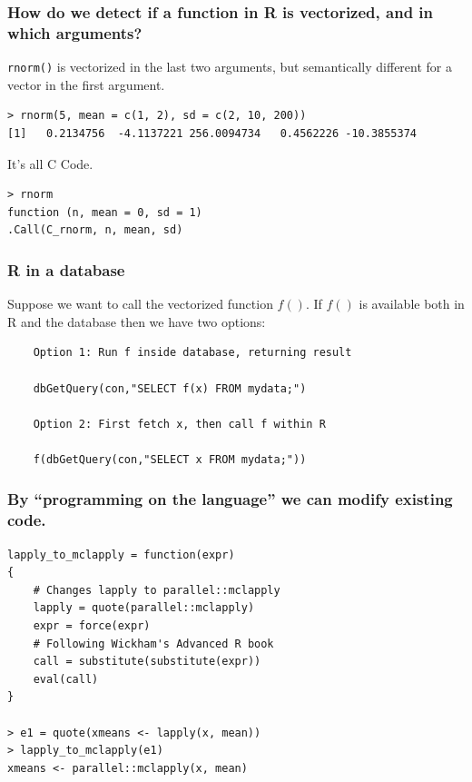 \documentclass{beamer}
\begin{document}
\begin{frame}[fragile]

    \frametitle{How do we detect if a function in R is vectorized, and in
    which arguments?}

    \texttt{rnorm()} is vectorized in the last two arguments, but
    semantically different for a vector in the first argument.

\begin{verbatim}
> rnorm(5, mean = c(1, 2), sd = c(2, 10, 200))
[1]   0.2134756  -4.1137221 256.0094734   0.4562226 -10.3855374
\end{verbatim}

It's all C Code.

\begin{verbatim}
> rnorm
function (n, mean = 0, sd = 1)
.Call(C_rnorm, n, mean, sd)
\end{verbatim}

\end{frame}
\begin{frame}[fragile]

    \frametitle{R in a database}

    Suppose we want to call the vectorized function $f()$. If $f()$ is
    available both in R and the database then we have two options:

\begin{verbatim}
    Option 1: Run f inside database, returning result
    
    dbGetQuery(con,"SELECT f(x) FROM mydata;")

    Option 2: First fetch x, then call f within R

    f(dbGetQuery(con,"SELECT x FROM mydata;"))
\end{verbatim}

\end{frame}
\begin{frame}[fragile]

    \frametitle{By ``programming on the language'' we can modify existing
    code.}

\begin{verbatim}
lapply_to_mclapply = function(expr)
{
    # Changes lapply to parallel::mclapply
    lapply = quote(parallel::mclapply)
    expr = force(expr)
    # Following Wickham's Advanced R book
    call = substitute(substitute(expr))
    eval(call)
}

> e1 = quote(xmeans <- lapply(x, mean))
> lapply_to_mclapply(e1)
xmeans <- parallel::mclapply(x, mean)
\end{verbatim}

\end{frame}
\end{document}
